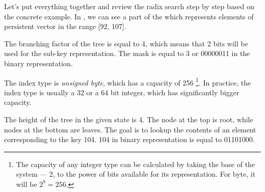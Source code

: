 \begin{figure}
\end{figure}

Let's put everything together and review the radix search step by step based on the concrete example. In , we can see a part of the \rbtree which represents elements of persistent vector in the range [92, 107].

The branching factor of the tree is equal to 4, which means that 2 bits will be used for the sub-key representation. The mask is equal to 3 or 00000011 in the binary representation.

The index type is \emph{unsigned byte}, which has a capacity of 256 \footnote{The capacity of any integer type can be calculated by taking the base of the system --- 2, to the power of bits available for its representation. For byte, it will be $2^8 = 256$.}. In practice, the index type is usually a 32 or a 64 bit integer, which has significantly bigger capacity.

The height of the tree in the given state is 4. The node at the top is root, while nodes at the bottom are leaves. The goal is to lookup the contents of an element corresponding to the key 104. 104 in binary representation is equal to 01101000.

